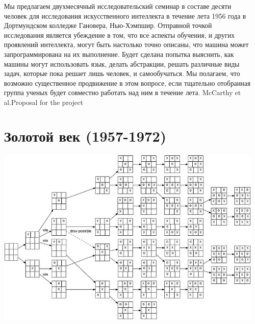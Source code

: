\documentclass[24pt,pdf,hyperref={unicode}]{beamer}
\begin{document}
\begin{frame}
\end{frame}

\begin{frame}
\citate
{
Мы предлагаем двухмесячный исследовательский семинар в составе десяти человек для исследования искусственного интеллекта в течение лета 1956 года в Дортмундском колледже Гановера, Нью-Хэмпшир. Отправной точкой исследования является убеждение в том, что все аспекты обучения, и других проявлений интеллекта, могут быть настолько точно описаны, что машина может запрограммирована на их выполнение. Будет сделана попытка выяснить, как машины могут использовать язык, делать абстракции, решать различные виды задач, которые пока решает лишь человек, и самообучаться. Мы полагаем, что возможно существенное продвижение в этом вопросе, если тщательно отобранная группа ученых будет совместно работать над ним в течение лета.
}{McCarthy et al.}{Proposal for the project}
\end{frame}

\section{Золотой век (1957-1972)}

\begin{frame}
\begin{center}
 \includegraphics[width=\textwidth]{tictactoe.jpg}
\end{center}
\end{frame}


\begin{frame}
\end{frame}
\end{document}

